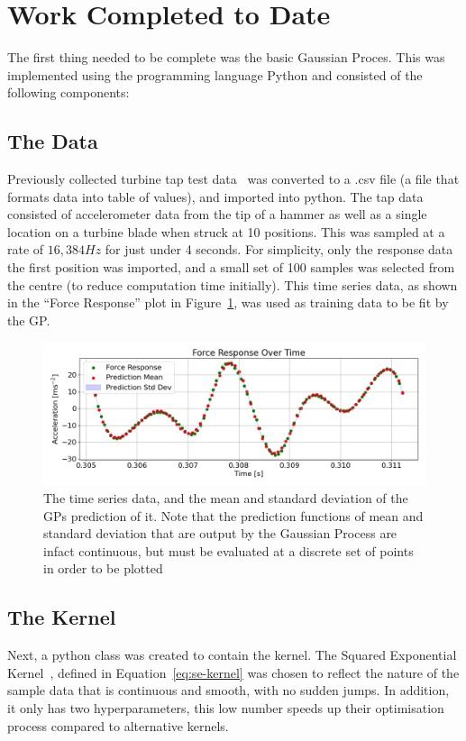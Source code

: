 \documentclass[12pt]{article}
\begin{document}
    \section{Work Completed to Date}
    The first thing needed to be complete was the basic Gaussian Proces.
    This was implemented using the programming language Python and consisted of the following components:
    \subsection{The Data}
    Previously collected turbine tap test data~\cite{MEC326} was converted to a .csv file (a file that formats data into table of values), and imported into python.
    The tap data consisted of accelerometer data from the tip of a hammer as well as a single location on a turbine blade when struck at 10 positions.
    This was sampled at a rate of $16,384 Hz$ for just under 4 seconds.
    For simplicity, only the response data the first position was imported, and a small set of 100 samples was selected from the centre (to reduce computation time initially).
    This time series data, as shown in the ``Force Response'' plot in Figure~\ref{fig:input-response-plot}, was used as training data to be fit by the GP\@.

    \begin{figure}[ht]
        \centering
        \includegraphics[width=1.0\linewidth]{figures/input-response-plot/input-response-plot.png}
        \caption{The time series data, and the mean and standard deviation of the GPs prediction of it. Note that the prediction functions of mean and standard deviation that are output by the Gaussian Process are infact continuous, but must be evaluated at a discrete set of points in order to be plotted}
        \label{fig:input-response-plot}
    \end{figure}



    \subsection{The Kernel}
    Next, a python class was created to contain the kernel.
    The Squared Exponential Kernel~\cite{duvenaud2014kernel}, defined in Equation~\ref{eq:se-kernel} was chosen to reflect the nature of the sample data that is continuous and smooth, with no sudden jumps.
    In addition, it only has two hyperparameters, this low number speeds up their optimisation process compared to alternative kernels.
\end{document}
